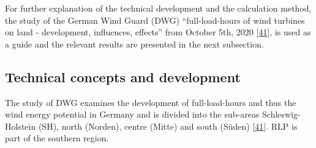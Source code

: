 \documentclass[a4paper,11pt]{article}
\begin{document}
For further explanation of the technical development and the calculation method, the study of the German Wind Guard (DWG) ``full-load-hours of wind turbines on land - development, influences, effects'' from October 5th, 2020 {[}\protect\hyperlink{ref-RasmusBorrmannDr.KnudRehfeldtDr.DennisKruse.2020}{41}{]}, is used as a guide and the relevant results are presented in the next subsection.

\hypertarget{technical-concepts-and-development}{%
\subsection{Technical concepts and development}\label{technical-concepts-and-development}}

The study of DWG examines the development of full-load-hours and thus the wind energy potential in Germany and is divided into the sub-areas Schleswig-Holstein (SH), north (Norden), centre (Mitte) and south (Süden) {[}\protect\hyperlink{ref-RasmusBorrmannDr.KnudRehfeldtDr.DennisKruse.2020}{41}{]}. RLP is part of the southern region.
\end{document}
